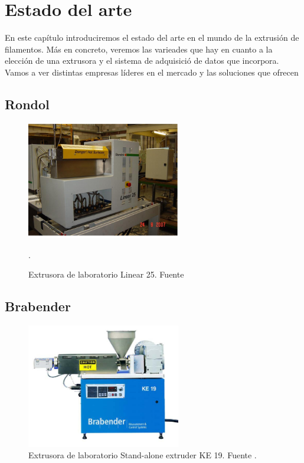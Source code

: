 
\chapter{Estado del arte}
\label{cap:estado}

En este capítulo introduciremos el estado del arte en el mundo de la extrusión de filamentos. Más en concreto, veremos las varieades que hay en cuanto a la elección de una extrusora y el sistema de adquisició de datos que incorpora. Vamos a ver distintas empresas líderes en el mercado y las soluciones que ofrecen

\section{Rondol}

\begin{figure}[H]
    \centering
    \includegraphics[width=0.6\textwidth]{images/rondol.png}
    \caption[Extrusora de laboratorio Linear 25]{Extrusora de laboratorio Linear 25. Fuente \cite{rondol}}
    \label{fig:rondol}.
\end{figure}


\section{Brabender}

\begin{figure}[H]
    \centering
    \includegraphics[width=0.6\textwidth]{images/brabender.jpg}
    \caption[Extrusora de laboratorio Stand-alone extruder KE 19]{Extrusora de laboratorio Stand-alone extruder KE 19. Fuente \cite{brabender}.}
    \label{fig:brabender}
\end{figure}

